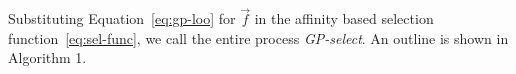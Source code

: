 Substituting Equation~\eqref{eq:gp-loo} for $\vec{f}$ in the affinity based selection function~\eqref{eq:sel-func}, 
we call the entire process \textit{GP-select}. An outline is shown in Algorithm 1.

%
%
%

%

